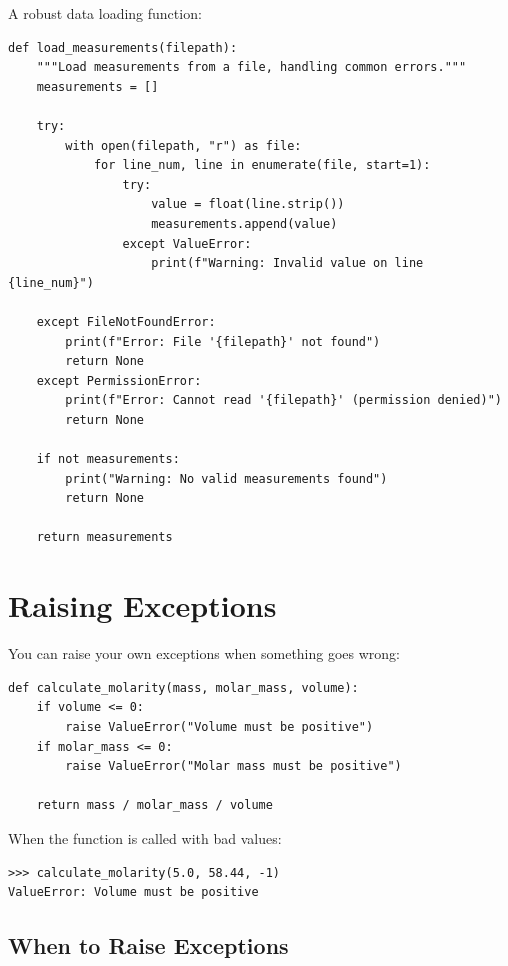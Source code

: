 \begin{labexample}
A robust data loading function:

\begin{lstlisting}
def load_measurements(filepath):
    """Load measurements from a file, handling common errors."""
    measurements = []

    try:
        with open(filepath, "r") as file:
            for line_num, line in enumerate(file, start=1):
                try:
                    value = float(line.strip())
                    measurements.append(value)
                except ValueError:
                    print(f"Warning: Invalid value on line {line_num}")

    except FileNotFoundError:
        print(f"Error: File '{filepath}' not found")
        return None
    except PermissionError:
        print(f"Error: Cannot read '{filepath}' (permission denied)")
        return None

    if not measurements:
        print("Warning: No valid measurements found")
        return None

    return measurements
\end{lstlisting}
\end{labexample}

\section{Raising Exceptions}
\label{sec:raising}

You can raise your own exceptions when something goes wrong:

\begin{lstlisting}
def calculate_molarity(mass, molar_mass, volume):
    if volume <= 0:
        raise ValueError("Volume must be positive")
    if molar_mass <= 0:
        raise ValueError("Molar mass must be positive")

    return mass / molar_mass / volume
\end{lstlisting}

When the function is called with bad values:

\begin{lstlisting}
>>> calculate_molarity(5.0, 58.44, -1)
ValueError: Volume must be positive
\end{lstlisting}

\subsection{When to Raise Exceptions}

